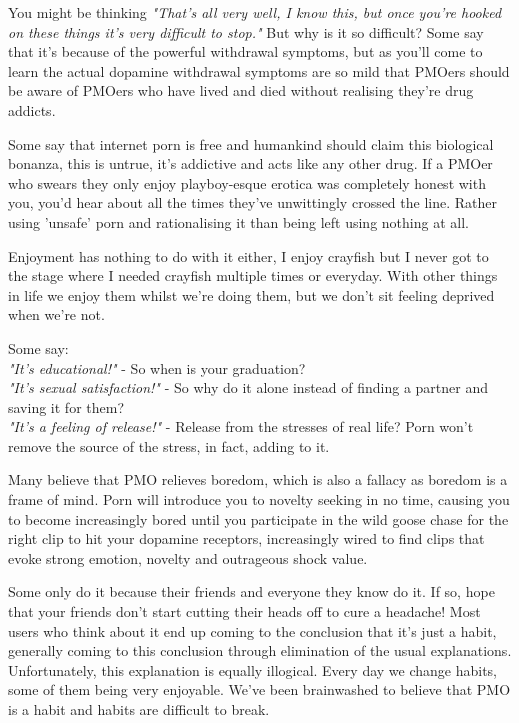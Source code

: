 \documentclass[easypeasy.tex]{subfiles}
\begin{document}
You might be thinking \textit{"That's all very well, I know this, but once you're hooked on these things it's very difficult to stop."} But why is it so difficult? Some say that it's because of the powerful withdrawal symptoms, but as you'll come to learn the actual dopamine withdrawal symptoms are so mild that PMOers should be aware of PMOers who have lived and died without realising they're drug addicts.

Some say that internet porn is free and humankind should claim this biological bonanza, this is untrue, it's addictive and acts like any other drug. If a PMOer who swears they only enjoy playboy-esque erotica was completely honest with you, you'd hear about all the times they've unwittingly crossed the line. Rather using 'unsafe' porn and rationalising it than being left using nothing at all.

Enjoyment has nothing to do with it either, I enjoy crayfish but I never got to the stage where I needed crayfish multiple times or everyday. With other things in life we enjoy them whilst we're doing them, but we don't sit feeling deprived when we're not.

Some say:\\
  \textit{"It's educational!"} - So when is your graduation?\\
  \textit{"It's sexual satisfaction!"} - So why do it alone instead of finding a partner and saving it for them?\\
  \textit{"It's a feeling of release!"} - Release from the stresses of real life? Porn won't remove the source of the stress, in fact, adding to it.

Many believe that PMO relieves boredom, which is also a fallacy as boredom is a frame of mind. Porn will introduce you to novelty seeking in no time, causing you to become increasingly bored until you participate in the wild goose chase for the right clip to hit your dopamine receptors, increasingly wired to find clips that evoke strong emotion, novelty and outrageous shock value.

Some only do it because their friends and everyone they know do it. If so, hope that your friends don't start cutting their heads off to cure a headache! Most users who think about it end up coming to the conclusion that it's just a habit, generally coming to this conclusion through elimination of the usual explanations. Unfortunately, this explanation is equally illogical. Every day we change habits, some of them being very enjoyable. We've been brainwashed to believe that PMO is a habit and habits are difficult to break.
\end{document}
